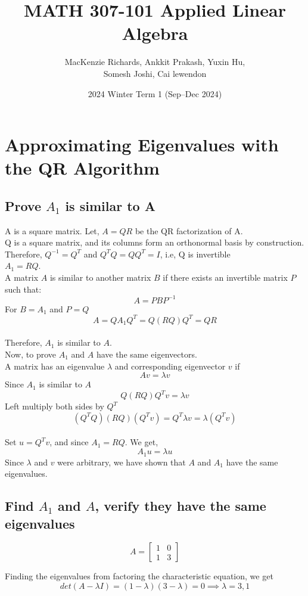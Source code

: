 \documentclass[12pt]{article}
\title{MATH 307-101
Applied Linear Algebra}
\author{MacKenzie Richards, Ankkit Prakash, Yuxin Hu, \\ Somesh Joshi, Cai lewendon}
\date{2024 Winter Term 1 (Sep–Dec 2024)}
\begin{document}
\maketitle
\section{Approximating Eigenvalues with the QR Algorithm}
\subsection{Prove $A_1$ is similar to A}
    A is a square matrix. Let, $A = QR$ be the QR factorization of A. \\
    Q is a square matrix, and its columns form an orthonormal basis by construction. \\
    Therefore, $Q^{-1} = Q^T$ and $Q^{T}Q = QQ^T = I$, i.e, Q is invertible\\
    $A_1 = RQ$.\\ 
    A matrix $A$ is similar to another matrix $B$ if there exists an invertible matrix $P$ such that:
    $$A = PBP^{-1}$$
    For $B = A_1$ and $P = Q$ \\
    $$A = QA_{1}Q^T = Q (RQ) Q^T = QR$$ \\
    Therefore, $A_1$ is similar to $A$. \\ 
    Now, to prove $A_1$ and $A$ have the same eigenvectors. \\
    A matrix has an eigenvalue $\lambda$ and corresponding eigenvector $v$ if \\
    $$Av = \lambda v$$
    Since $A_1$ is similar to $A$
    $$Q (RQ) Q^T v = \lambda v$$
    Left multiply both sides by $Q^T$
    $$ (Q^{T}Q) (RQ) (Q^{T}v) = Q^{T} \lambda v = \lambda (Q^{T}v)$$ \\
    Set $u = Q^{T} v$, and since $A_1 = RQ$. We get, \\
    $$ A_1 u = \lambda u$$
    Since $\lambda$ and $v$ were arbitrary, we have shown that $A$ and $A_1$ have the same eigenvalues.

\subsection{Find $A_1$ and $A$, verify they have the same eigenvalues}

$$
A = \begin{bmatrix}
1 & 0 \\
1 & 3 
\end{bmatrix} 
$$

    Finding the eigenvalues from factoring the characteristic equation, we get \\
    $$det(A - \lambda I) = (1 - \lambda)(3 - \lambda) = 0 \implies \lambda = 3,1$$ \\
\end{document}
